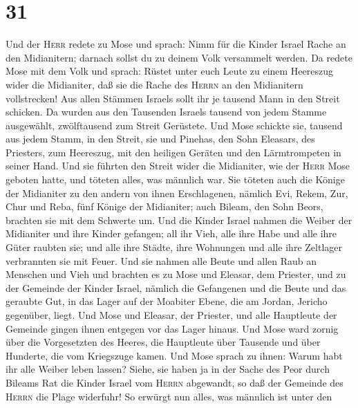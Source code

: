 \hypertarget{section-30}{%
\section{31}\label{section-30}}

 Und der \textsc{Herr} redete zu Mose und sprach: Nimm für
die Kinder Israel Rache an den Midianitern;  darnach
sollst du zu deinem Volk versammelt werden.  Da redete
Mose mit dem Volk und sprach: Rüstet unter euch Leute zu einem Heereszug
wider die Midianiter, daß sie die Rache des \textsc{Herrn} an den
Midianitern vollstrecken!  Aus allen Stämmen Israels sollt
ihr je tausend Mann in den Streit schicken.  Da wurden aus
den Tausenden Israels tausend von jedem Stamme ausgewählt, zwölftausend
zum Streit Gerüstete.  Und Mose schickte sie, tausend aus
jedem Stamm, in den Streit, sie und Pinehas, den Sohn Eleasars, des
Priesters, zum Heereszug, mit den heiligen Geräten und den Lärmtrompeten
in seiner Hand.  Und sie führten den Streit wider die
Midianiter, wie der \textsc{Herr} Mose geboten hatte, und töteten alles,
was männlich war.  Sie töteten auch die Könige der
Midianiter zu den andern von ihnen Erschlagenen, nämlich Evi, Rekem,
Zur, Chur und Reba, fünf Könige der Midianiter; auch Bileam, den Sohn
Beors, brachten sie mit dem Schwerte um.  Und die Kinder
Israel nahmen die Weiber der Midianiter und ihre Kinder gefangen; all
ihr Vieh, alle ihre Habe und alle ihre Güter raubten sie;
 und alle ihre Städte, ihre Wohnungen und alle ihre
Zeltlager verbrannten sie mit Feuer.  Und sie nahmen alle
Beute und allen Raub an Menschen und Vieh  und brachten
es zu Mose und Eleasar, dem Priester, und zu der Gemeinde der Kinder
Israel, nämlich die Gefangenen und die Beute und das geraubte Gut, in
das Lager auf der Moabiter Ebene, die am Jordan, Jericho gegenüber,
liegt.  Und Mose und Eleasar, der Priester, und alle
Hauptleute der Gemeinde gingen ihnen entgegen vor das Lager hinaus.
 Und Mose ward zornig über die Vorgesetzten des Heeres,
die Hauptleute über Tausende und über Hunderte, die vom Kriegszuge
kamen.  Und Mose sprach zu ihnen: Warum habt ihr alle
Weiber leben lassen?  Siehe, sie haben ja in der Sache
des Peor durch Bileams Rat die Kinder Israel vom \textsc{Herrn}
abgewandt, so daß der Gemeinde des \textsc{Herrn} die Plage widerfuhr!
 So erwürgt nun alles, was männlich ist unter den

